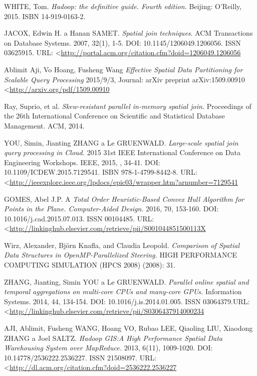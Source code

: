 \documentclass[a4paper,12pt,oneside]{report}
\begin{document}
\begin{thebibliography}{99}
\label{References}



WHITE, Tom. \textit{Hadoop: the definitive guide. Fourth edition.} Beijing: O'Reilly, 2015. ISBN 14-919-0163-2.

JACOX, Edwin H. a Hanan SAMET. \textit{Spatial join techniques}. ACM Transactions on Database Systems. 2007, 32(1), 1-5. DOI: 10.1145/1206049.1206056. ISSN 03625915. URL: \textless\url{http://portal.acm.org/citation.cfm?doid=1206049.1206056}

Ablimit Aji, Vo Hoang, Fusheng Wang \textit{Effective Spatial Data Partitioning for Scalable Query Processing} 2015/9/3,
Journal: arXiv preprint arXiv:1509.00910 \textless\url{http://arxiv.org/pdf/1509.00910}

Ray, Suprio, et al. \textit{Skew-resistant parallel in-memory spatial join.} Proceedings of the 26th International Conference on Scientific and Statistical Database Management. ACM, 2014.

YOU, Simin, Jianting ZHANG a Le GRUENWALD. \textit{Large-scale spatial join query processing in Cloud.} 2015 31st IEEE International Conference on Data Engineering Workshops. IEEE, 2015, , 34-41. DOI: 10.1109/ICDEW.2015.7129541. ISBN 978-1-4799-8442-8. URL: \textless\url{http://ieeexplore.ieee.org/lpdocs/epic03/wrapper.htm?arnumber=7129541}

GOMES, Abel J.P. A \textit{Total Order Heuristic-Based Convex Hull Algorithm for Points in the Plane. Computer-Aided Design.} 2016, 70, 153-160. DOI: 10.1016/j.cad.2015.07.013. ISSN 00104485.  URL: \textless\url{http://linkinghub.elsevier.com/retrieve/pii/S001044851500113X}

Wirz, Alexander, Björn Knafla, and Claudia Leopold. \textit{Comparison of Spatial Data Structures in OpenMP-Parallelized Steering.} HIGH PERFORMANCE COMPUTING  SIMULATION (HPCS 2008) (2008): 31.

ZHANG, Jianting, Simin YOU a Le GRUENWALD. \textit{Parallel online spatial and temporal aggregations on multi-core CPUs and many-core GPUs.} Information Systems. 2014, 44, 134-154. DOI: 10.1016/j.is.2014.01.005. ISSN 03064379.URL:  \textless\url{http://linkinghub.elsevier.com/retrieve/pii/S0306437914000234}


AJI, Ablimit, Fusheng WANG, Hoang VO, Rubao LEE, Qiaoling LIU, Xiaodong ZHANG a Joel SALTZ. \textit{Hadoop GIS:A High Performance Spatial Data Warehousing System over MapReduce.} 2013, 6(11), 1009-1020. DOI: 10.14778/2536222.2536227. ISSN 21508097.  URL:  \textless\url{http://dl.acm.org/citation.cfm?doid=2536222.2536227}


\end{thebibliography}
\end{document}
